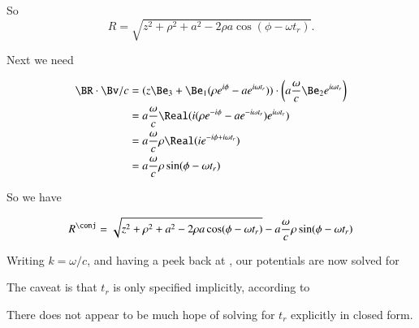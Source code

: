 {So
\begin{equation}\label{eqn:relativisticElectrodynamicsExamReflection:130}
R = \sqrt{z^2 + \rho^2 + a^2 - 2 \rho a \cos( \phi - \omega t_r ) }.
\end{equation}

Next we need

\begin{equation}\label{eqn:relativisticElectrodynamicsExamReflection:1070}
\begin{aligned}
\BR \cdot \Bv/c
&=
(z \Be_3 + \Be_1 (\rho e^{i \phi} - a e^{i \omega t_r} )) \cdot
\left(a \frac{\omega}{c} \Be_2 e^{i \omega t_r} \right) \\
&=
a \frac{\omega }{c}
\Real(
i (\rho e^{-i \phi} - a e^{-i \omega t_r} ) e^{i \omega t_r} ) \\
&=
a \frac{\omega }{c}
\rho \Real( i e^{-i \phi + i \omega t_r} ) \\
&=
a \frac{\omega }{c}
\rho \sin(\phi - \omega t_r)
\end{aligned}
\end{equation}

So we have

\begin{equation}\label{eqn:relativisticElectrodynamicsExamReflection:150}
R^\conj = \sqrt{z^2 + \rho^2 + a^2 - 2 \rho a \cos( \phi - \omega t_r ) }
-a \frac{\omega }{c} \rho \sin(\phi - \omega t_r)
\end{equation}

Writing \(k = \omega/c\), and having a peek back at , our potentials are now solved for


The caveat is that \(t_r\) is only specified implicitly, according to


There does not appear to be much hope of solving for \(t_r\) explicitly in closed form.


}
